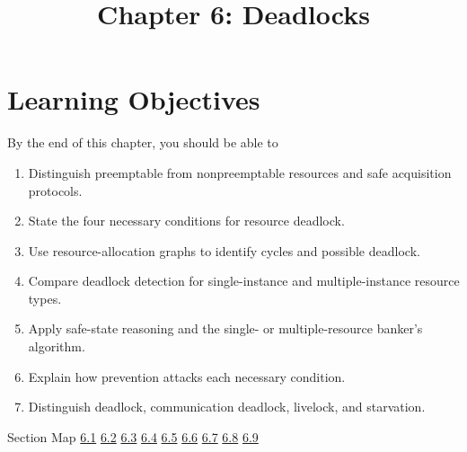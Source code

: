 \documentclass[10pt,letterpaper]{article}
\title{Chapter 6: Deadlocks}
\author{}
\date{}
\begin{document}
\maketitle
\section*{Learning Objectives}
\begin{studybox}{By the end of this chapter, you should be able to}
\begin{enumerate}
  \item Distinguish preemptable from nonpreemptable resources and safe acquisition protocols.
  \item State the four necessary conditions for resource deadlock.
  \item Use resource-allocation graphs to identify cycles and possible deadlock.
  \item Compare deadlock detection for single-instance and multiple-instance resource types.
  \item Apply safe-state reasoning and the single- or multiple-resource banker's algorithm.
  \item Explain how prevention attacks each necessary condition.
  \item Distinguish deadlock, communication deadlock, livelock, and starvation.
\end{enumerate}
\end{studybox}

\begin{studybox}{Section Map}
\hyperlink{sec-6-1}{6.1} \quad \hyperlink{sec-6-2}{6.2} \quad \hyperlink{sec-6-3}{6.3} \quad \hyperlink{sec-6-4}{6.4} \quad \hyperlink{sec-6-5}{6.5} \quad \hyperlink{sec-6-6}{6.6} \quad \hyperlink{sec-6-7}{6.7} \quad \hyperlink{sec-6-8}{6.8} \quad \hyperlink{sec-6-9}{6.9}
\end{studybox}
\end{document}
